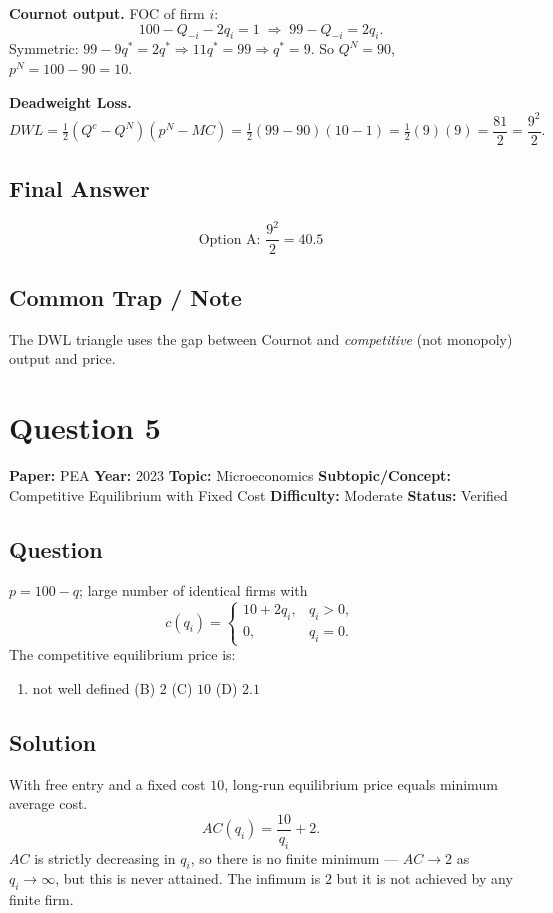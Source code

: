 \documentclass[11pt]{article}
\begin{document}
\medskip\noindent\textbf{Cournot output.} FOC of firm $i$:
\[
100-Q_{-i}-2q_i=1 \;\Longrightarrow\; 99-Q_{-i}=2q_i.
\]
Symmetric: $99-9 q^*=2 q^*\Rightarrow 11 q^*=99\Rightarrow q^*=9$.
So $Q^N=90$, $p^N=100-90=10$.

\medskip\noindent\textbf{Deadweight Loss.}
\[
DWL=\tfrac{1}{2}(Q^c-Q^N)(p^N-MC)=\tfrac{1}{2}(99-90)(10-1)=\tfrac{1}{2}(9)(9)=\frac{81}{2}=\frac{9^2}{2}.
\]

\subsection*{Final Answer}
\[
\boxed{\text{Option A: } \dfrac{9^2}{2}=40.5}
\]

\subsection*{Common Trap / Note}
The DWL triangle uses the gap between Cournot and \emph{competitive} (not monopoly) output and price.

\medskip

\section*{Question 5}
\textbf{Paper:} PEA \quad \textbf{Year:} 2023 \quad \textbf{Topic:} Microeconomics \quad \textbf{Subtopic/Concept:} Competitive Equilibrium with Fixed Cost \quad \textbf{Difficulty:} Moderate \quad \textbf{Status:} Verified

\subsection*{Question}
$p=100-q$; large number of identical firms with
\[
c(q_i)=\begin{cases}10+2q_i, & q_i>0,\\ 0, & q_i=0.\end{cases}
\]
The competitive equilibrium price is:
\begin{enumerate}[label=(\Alph*)]
\item not well defined \quad (B) $2$ \quad (C) $10$ \quad (D) $2.1$
\end{enumerate}

\subsection*{Solution}
With free entry and a fixed cost $10$, long-run equilibrium price equals minimum average cost.
\[
AC(q_i)=\frac{10}{q_i}+2.
\]
$AC$ is strictly decreasing in $q_i$, so there is no finite minimum --- $AC\to 2$ as $q_i\to\infty$, but this is never attained. The infimum is $2$ but it is not achieved by any finite firm.
\end{document}
